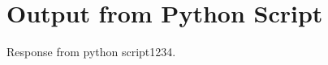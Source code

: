 \documentclass[12pt, a4paper]{article}
\begin{document}
\section*{Output from Python Script}

Response from python script1234.
\end{document}
